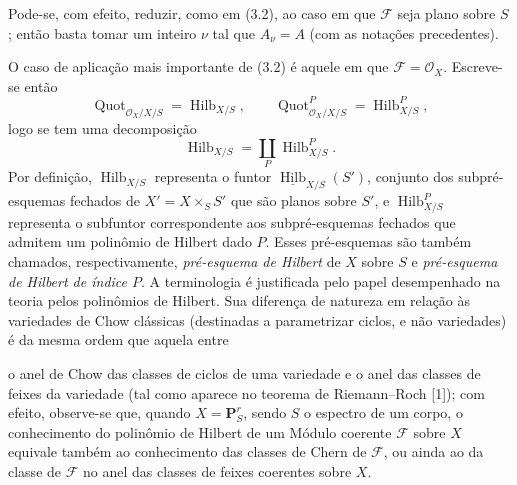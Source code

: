 \documentclass[11pt,twoside,openany]{book}
\numberwithin{equation}{section}
\newcommand{\src}[1]{%
  \phantomsection\hypertarget{src:#1}{}%
  \marginpar{\raggedleft\footnotesize\sffamily #1}%
}
\theoremstyle{plain}
\theoremstyle{definition}
\theoremstyle{remark}
\newcommand{\FgaUnitKey}{frontmatter}
\renewcommand{\src}[1]{%
  \phantomsection\hypertarget{src:\FgaUnitKey:#1}{}%
  \marginpar{\raggedleft\footnotesize\sffamily #1}%
}
\begin{document}
Pode-se, com efeito, reduzir, como em (3.2), ao caso em que $\mathcal F$ seja
plano sobre $S$; então basta tomar um inteiro $\nu$ tal que $A_\nu=A$ (com as
notações precedentes).

O caso de aplicação mais importante de (3.2) é aquele em que
$\mathcal F=\mathcal O_X$. Escreve-se então
\[
\operatorname{Quot}_{\mathcal O_X/X/S}=\operatorname{Hilb}_{X/S},
\qquad
\operatorname{Quot}^P_{\mathcal O_X/X/S}=\operatorname{Hilb}^P_{X/S},
\]
logo se tem uma decomposição
\[
\operatorname{Hilb}_{X/S}=\coprod_P\operatorname{Hilb}^P_{X/S}.
\]
Por definição, $\operatorname{Hilb}_{X/S}$ representa o funtor
$\underline{\operatorname{Hilb}}_{X/S}(S')$, conjunto dos subpré-esquemas
fechados de $X'=X\times_SS'$ que são planos sobre $S'$, e
$\operatorname{Hilb}^P_{X/S}$ representa o subfuntor correspondente aos
subpré-esquemas fechados que admitem um polinômio de Hilbert dado $P$. Esses
pré-esquemas são também chamados, respectivamente, \emph{pré-esquema de
Hilbert} de $X$ sobre $S$ e \emph{pré-esquema de Hilbert de índice $P$}. A
terminologia é justificada pelo papel desempenhado na teoria pelos polinômios
de Hilbert. Sua diferença de natureza em relação às variedades de Chow
clássicas (destinadas a parametrizar ciclos, e não variedades) é da mesma ordem
que aquela entre
\src{266}
o anel de Chow das classes de ciclos de uma variedade e o anel das classes
de feixes da variedade (tal como aparece no teorema de Riemann--Roch [1]);
com efeito, observe-se que, quando $X=\mathbf P^r_S$, sendo $S$ o espectro
de um corpo, o conhecimento do polinômio de Hilbert de um Módulo coerente
$\mathcal F$ sobre $X$ equivale também ao conhecimento das classes de Chern
de $\mathcal F$, ou ainda ao da classe de $\mathcal F$ no anel das classes de
feixes coerentes sobre $X$.
\end{document}
